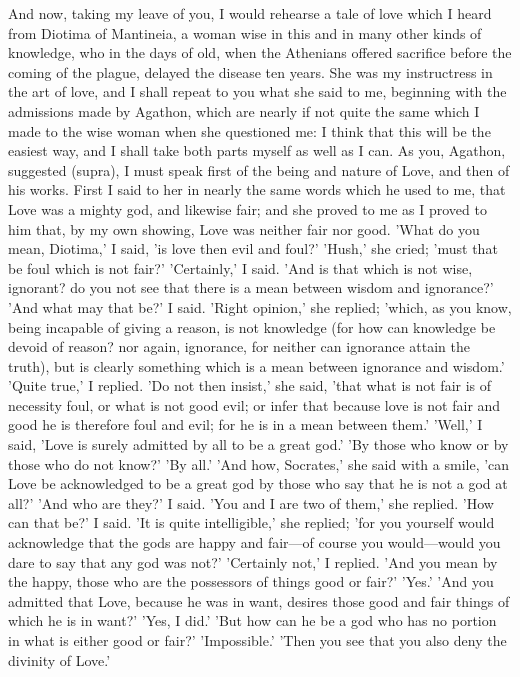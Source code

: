 \para[114] And now, taking my leave of you, I would rehearse a tale of love which I heard from Diotima of Mantineia, a woman wise in this and in many other kinds of knowledge, who in the days of old, when the Athenians offered sacrifice before the coming of the plague, delayed the disease ten years. She was my instructress in the art of love, and I shall repeat to you what she said to me, beginning with the admissions made by Agathon, which are nearly if not quite the same which I made to the wise woman when she questioned me: I think that this will be the easiest way, and I shall take both parts myself as well as I can. As you, Agathon, suggested (supra), I must speak first of the being and nature of Love, and then of his works. First I said to her in nearly the same words which he used to me, that Love was a mighty god, and likewise fair; and she proved to me as I proved to him that, by my own showing, Love was neither fair nor good. 'What do you mean, Diotima,' I said, 'is love then evil and foul?' 'Hush,' she cried; 'must that be foul which is not fair?' 'Certainly,' I said. 'And is that which is not wise, ignorant? do you not see that there is a mean between wisdom and ignorance?' 'And what may that be?' I said. 'Right opinion,' she replied; 'which, as you know, being incapable of giving a reason, is not knowledge (for how can knowledge be devoid of reason? nor again, ignorance, for neither can ignorance attain the truth), but is clearly something which is a mean between ignorance and wisdom.' 'Quite true,' I replied. 'Do not then insist,' she said, 'that what is not fair is of necessity foul, or what is not good evil; or infer that because love is not fair and good he is therefore foul and evil; for he is in a mean between them.' 'Well,' I said, 'Love is surely admitted by all to be a great god.' 'By those who know or by those who do not know?' 'By all.' 'And how, Socrates,' she said with a smile, 'can Love be acknowledged to be a great god by those who say that he is not a god at all?' 'And who are they?' I said. 'You and I are two of them,' she replied. 'How can that be?' I said. 'It is quite intelligible,' she replied; 'for you yourself would acknowledge that the gods are happy and fair---of course you would---would you dare to say that any god was not?' 'Certainly not,' I replied. 'And you mean by the happy, those who are the possessors of things good or fair?' 'Yes.' 'And you admitted that Love, because he was in want, desires those good and fair things of which he is in want?' 'Yes, I did.' 'But how can he be a god who has no portion in what is either good or fair?' 'Impossible.' 'Then you see that you also deny the divinity of Love.'

